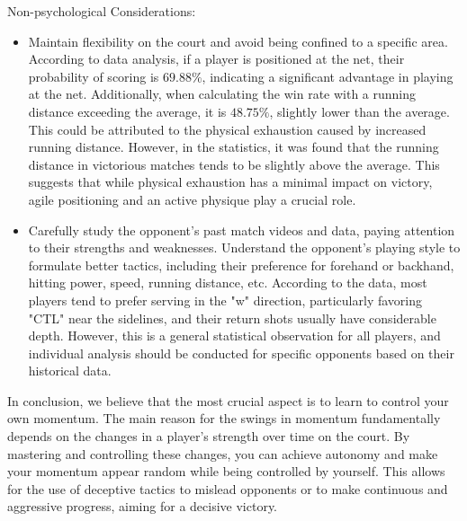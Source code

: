 Non-psychological Considerations:
\begin{itemize}[label=\textbf{\normalsize$\bullet$}]

\item Maintain flexibility on the court and avoid being confined to a specific area. According to data analysis, if a player is positioned at the net, their probability of scoring is \(69.88\%\), indicating a significant advantage in playing at the net. Additionally, when calculating the win rate with a running distance exceeding the average, it is \(48.75\%\), slightly lower than the average. This could be attributed to the physical exhaustion caused by increased running distance. However, in the statistics, it was found that the running distance in victorious matches tends to be slightly above the average. This suggests that while physical exhaustion has a minimal impact on victory, agile positioning and an active physique play a crucial role.

\item Carefully study the opponent's past match videos and data, paying attention to their strengths and weaknesses. Understand the opponent's playing style to formulate better tactics, including their preference for forehand or backhand, hitting power, speed, running distance, etc. According to the data, most players tend to prefer serving in the "w" direction, particularly favoring "CTL" near the sidelines, and their return shots usually have considerable depth. However, this is a general statistical observation for all players, and individual analysis should be conducted for specific opponents based on their historical data.
\end{itemize}

In conclusion, we believe that the most crucial aspect is to learn to control your own momentum. The main reason for the swings in momentum fundamentally depends on the changes in a player's strength over time on the court. By mastering and controlling these changes, you can achieve autonomy and make your momentum appear random while being controlled by yourself. This allows for the use of deceptive tactics to mislead opponents or to make continuous and aggressive progress, aiming for a decisive victory.





